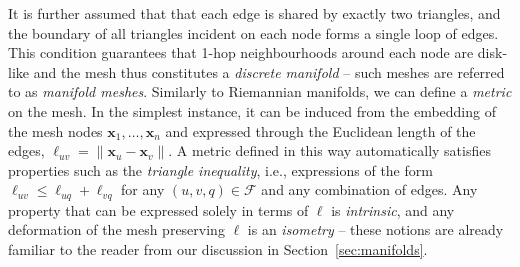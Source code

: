 It is further assumed that that each edge is shared by exactly two triangles, and the boundary of all triangles incident on each node forms a single loop of edges. This condition guarantees that 1-hop neighbourhoods around each node are disk-like and the mesh thus constitutes a {\em discrete manifold} -- such meshes are referred to as {\em manifold meshes}. 
%
%
%
Similarly to Riemannian manifolds, we can define a {\em metric} on the mesh. In the simplest instance, it can be  induced from the embedding of the mesh nodes $\mathbf{x}_1, \hdots, \mathbf{x}_n$ and expressed through the Euclidean length of the edges, $\ell_{uv} = \| \mathbf{x}_u - \mathbf{x}_v \|$. 
%
A metric defined in this way automatically satisfies properties such as the {\em triangle inequality}, i.e., expressions of the form 
$
\ell_{uv} \leq \ell_{uq} + \ell_{vq}
$
for any $(u,v,q) \in \mathcal{F}$ and any combination of edges. %
%
Any property that can be expressed solely in terms of $\ell$ is {\em intrinsic}, and any deformation of the mesh preserving $\ell$ is an {\em isometry}  -- these notions are already familiar to the reader from our discussion in Section~\ref{sec:manifolds}.   
%


